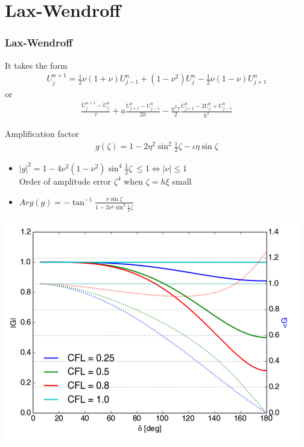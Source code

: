 \documentclass{beamer}
\begin{document}
\section{Lax-Wendroff}
\begin{frame}
\frametitle{Lax-Wendroff}
It takes the form
\begin{align*}
U_j^{n+1} = \frac{1}{2}\nu(1 + \nu)U_{j-1}^n + (1 - \nu^2)U_j^n - \frac{1}{2}\nu(1 - \nu)U_{j+1}^n
\end{align*}
or
\begin{align*}
\frac{U_j^{n+1} - U_j^n}{\tau} + a \frac{U_{j+1}^n -U_{j-1}^n}{2h} -\frac{a^2\tau}{2}\frac{U_{j+1}^n -2U_j^n+U_{j-1}^n}{h^2}
\end{align*}
\end{frame}
\begin{frame}
Amplification factor
\begin{align*}
g(\zeta) = 1 - 2 \eta^2\sin^2{\frac{1}{2}\zeta} - \iota \eta \sin{\zeta}
\end{align*}
\begin{itemize}
\setlength\itemsep{1em}
\item $|g|^2 = 1 - 4\nu^2(1-\nu^2)\sin^4{\frac{1}{2}\zeta} \ \leq 1 \iff |\nu| \leq 1$ \\ Order of amplitude error $\zeta^4$ when $\zeta = h\xi$ small
\item $Arg(g) = \displaystyle{-\tan^{-1}{\frac{\nu \sin{\zeta}}{1 - 2\nu^2\sin^2{\frac{1}{2}\zeta}}}}$
\end{itemize}
\end{frame}
\begin{frame}
\cite{ebook}
\includegraphics[width=\textwidth]{lw_g}
\end{frame}
\end{document}
